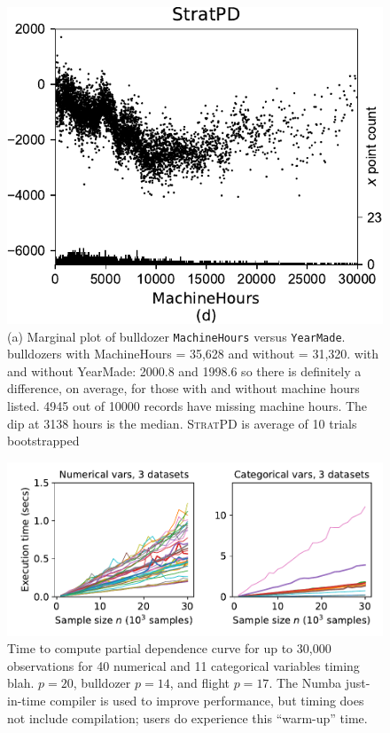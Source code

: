 \documentclass[]{article} %
\newcommand{\spd}{\fontfamily{cmr}\textsc{\small StratPD}}
\begin{document}
{\begin{figure}[!htbp]
\begin{center}
\includegraphics[scale=0.35]{images/bulldozer_MachineHours_stratpd.pdf}
\caption{\small (a) Marginal plot of bulldozer {\tt MachineHours} versus {\tt YearMade}.  bulldozers with MachineHours = 35,628 and without = 31,320. with and without YearMade: 2000.8 and 1998.6 so there is definitely a difference, on average, for those with and without machine hours listed. 4945 out of 10000 records have missing machine hours.  The dip at 3138 hours is the median. \spd{} is average of 10 trials bootstrapped}
\label{fig:machinehours}
\end{center}
\end{figure}
}

\begin{figure}[!htbp]
\begin{center}
\includegraphics[scale=.4]{images/timing.pdf}\vspace{-3mm}
\caption{\small Time to compute partial dependence curve for up to 30,000 observations for 40 numerical and 11 categorical variables timing blah. $p=20$, bulldozer $p=14$, and flight $p=17$. The Numba just-in-time compiler is used to improve performance, but timing does not include compilation; users do experience this ``warm-up'' time.}
\label{fig:timing}
\end{center}
\end{figure}
\end{document}

